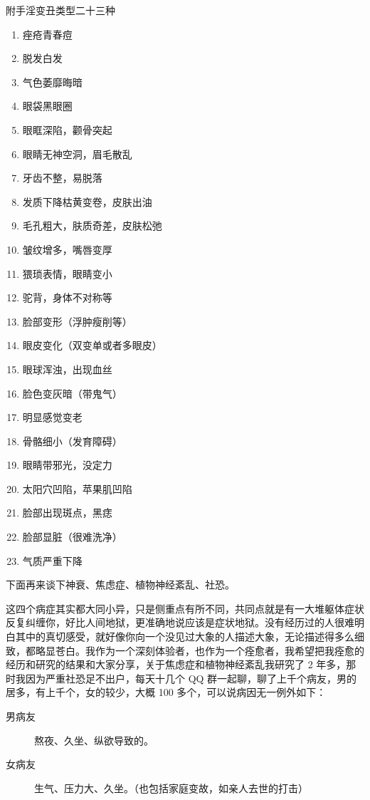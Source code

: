 \documentclass{ctexart}
\begin{document}
附手淫变丑类型二十三种

\begin{enumerate}
    \item 痤疮青春痘
    \item 脱发白发
    \item 气色萎靡晦暗
    \item 眼袋黑眼圈
    \item 眼眶深陷，颧骨突起
    \item 眼睛无神空洞，眉毛散乱
    \item 牙齿不整，易脱落
    \item 发质下降枯黄变卷，皮肤出油
    \item 毛孔粗大，肤质奇差，皮肤松弛
    \item 皱纹增多，嘴唇变厚
    \item 猥琐表情，眼睛变小
    \item 驼背，身体不对称等
    \item 脸部变形（浮肿瘦削等）
    \item 眼皮变化（双变单或者多眼皮）
    \item 眼球浑浊，出现血丝
    \item 脸色变灰暗（带鬼气）
    \item 明显感觉变老
    \item 骨骼细小（发育障碍）
    \item 眼睛带邪光，没定力
    \item 太阳穴凹陷，苹果肌凹陷
    \item 脸部出现斑点，黑痣
    \item 脸部显脏（很难洗净）
    \item 气质严重下降
\end{enumerate}

下面再来谈下神衰、焦虑症、植物神经紊乱、社恐。

这四个病症其实都大同小异，只是侧重点有所不同，共同点就是有一大堆躯体症状反复纠缠你，好比人间地狱，更准确地说应该是症状地狱。没有经历过的人很难明白其中的真切感受，就好像你向一个没见过大象的人描述大象，无论描述得多么细致，都略显苍白。我作为一个深刻体验者，也作为一个痊愈者，我希望把我痊愈的经历和研究的结果和大家分享，关于焦虑症和植物神经紊乱我研究了 2 年多，那时我因为严重社恐足不出户，每天十几个 QQ 群一起聊，聊了上千个病友，男的居多，有上千个，女的较少，大概 100 多个，可以说病因无一例外如下：

\begin{description}
    \item[男病友] 熬夜、久坐、纵欲导致的。
    \item[女病友] 生气、压力大、久坐。（也包括家庭变故，如亲人去世的打击）
\end{description}
\end{document}
